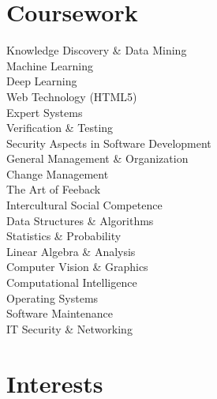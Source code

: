 \documentclass[a4paper]{./src/resume-cv}
\begin{document}
\pagebreak
\vfill
\noindent
\begin{minipage}[t]{0.42\textwidth}
	\section{Coursework}
	\medsep
	Knowledge Discovery \& Data Mining \\
	Machine Learning \\
	Deep Learning \\
	Web Technology (HTML5) \\
	Expert Systems \\
	Verification \& Testing \\
	Security Aspects in Software Development \\
	General Management \& Organization \\
	Change Management \\
	The Art of Feeback \\
	Intercultural Social Competence \\
	\subsectionsep
	\medsep
	Data Structures \& Algorithms \\
	Statistics \& Probability \\
	Linear Algebra \& Analysis \\
	Computer Vision \& Graphics \\
	Computational Intelligence \\
	Operating Systems \\
	Software Maintenance \\
	IT Security \& Networking \\
	
	\sectionsep

	\section{Interests} 

\end{minipage}
\end{document}
